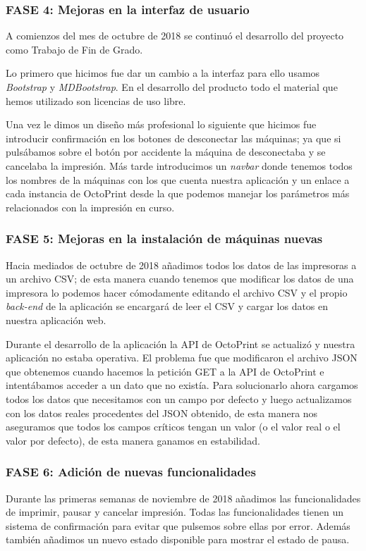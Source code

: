 
\subsubsection{FASE 4: Mejoras en la interfaz de usuario}

A comienzos del mes de octubre de 2018 se continuó el desarrollo del proyecto como Trabajo de Fin de Grado.

Lo primero que hicimos fue dar un cambio a la interfaz para ello usamos \textit{Bootstrap} y \textit{MDBootstrap}. En el desarrollo del producto todo el material que hemos utilizado son licencias de uso libre. 

Una vez le dimos un diseño más profesional lo siguiente que hicimos fue introducir confirmación en los botones de desconectar las máquinas; ya que si pulsábamos sobre el botón por accidente la máquina de desconectaba y se cancelaba la impresión. Más tarde introducimos un \textit{navbar} donde tenemos todos los nombres de la máquinas con los que cuenta nuestra aplicación y un enlace a cada instancia de OctoPrint desde la que podemos manejar los parámetros más relacionados con la impresión en curso.

\subsubsection{FASE 5: Mejoras en la instalación de máquinas nuevas}

Hacia mediados de octubre de 2018 añadimos todos los datos de las impresoras a un archivo CSV; de esta manera cuando tenemos que modificar los datos de una impresora lo podemos hacer cómodamente editando el archivo CSV y el propio \textit{back-end} de la aplicación se encargará de leer el CSV y cargar los datos en nuestra aplicación web.

Durante el desarrollo de la aplicación la API de OctoPrint se actualizó y nuestra aplicación no estaba operativa. El problema fue que modificaron el archivo JSON que obtenemos cuando hacemos la petición GET a la API de OctoPrint e intentábamos acceder a un dato que no existía. Para solucionarlo ahora cargamos todos los datos que necesitamos con un campo por defecto y luego actualizamos con los datos reales procedentes del JSON obtenido, de esta manera nos aseguramos que todos los campos críticos tengan un valor (o el valor real o el valor por defecto), de esta manera ganamos en estabilidad.

\subsubsection{FASE 6: Adición de nuevas funcionalidades}
Durante las primeras semanas de noviembre de 2018 añadimos las funcionalidades de imprimir, pausar y cancelar impresión. Todas las funcionalidades tienen un sistema de confirmación para evitar que pulsemos sobre ellas por error.
Además también añadimos un nuevo estado disponible para mostrar el estado de pausa.

